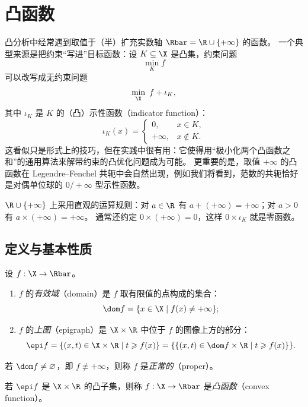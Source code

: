 \chapter{凸函数}
\label{ch:ch02}

凸分析中经常遇到取值于（半）扩充实数轴 $\Rbar = \R\cup\{+\infty\}$ 的函数。
一个典型来源是把约束“写进”目标函数：设 $K\subseteq\X$ 是凸集，约束问题
\[
  \min_{K} f
\]
可以改写成无约束问题
\[
  \min_{\X}\ f + \iota_K ,
\]
其中 $\iota_K$ 是 $K$ 的（凸）示性函数（indicator function）：
\[
  \iota_K(x) =
  \begin{cases}
    0, & x\in K,\\
    +\infty, & x\notin K.
  \end{cases}
\]
这看似只是形式上的技巧，但在实践中很有用：它使得用“极小化两个凸函数之和”的通用算法来解带约束的凸优化问题成为可能。
更重要的是，取值 $+\infty$ 的凸函数在 Legendre--Fenchel 共轭中会自然出现，例如我们将看到，范数的共轭恰好是对偶单位球的 $0/+\infty$ 型示性函数。

$\R\cup\{+\infty\}$ 上采用直观的运算规则：对 $a\in\R$ 有 $a+(+\infty)=+\infty$；对 $a>0$ 有 $a\times(+\infty)=+\infty$。
通常还约定 $0\times(+\infty)=0$，这样 $0\times\iota_K$ 就是零函数。

\section{定义与基本性质}

\begin{definition}[有效域与上图]
\label{def:11}
设 $f:\X\to\Rbar$。
\begin{enumerate}[label=(\roman*)]
  \item $f$ 的\emph{有效域}（domain）是 $f$ 取有限值的点构成的集合：
  \[
    \dom f = \{x\in\X \mid f(x)\neq+\infty\};
  \]
  \item $f$ 的\emph{上图}（epigraph）是 $\X\times\R$ 中位于 $f$ 的图像上方的部分：
  \[
    \epi f = \{(x,t)\in\X\times\R \mid t\geqslant f(x)\} = \{\{(x,t)\in\dom f\times\R \mid t\geqslant f(x)\}\}.
  \]
\end{enumerate}
若 $\dom f\neq\varnothing$，即 $f\not\equiv+\infty$，则称 $f$ 是\emph{正常的}（proper）。
\end{definition}

\begin{definition}[凸函数]
\label{def:12}
若 $\epi f$ 是 $\X\times\R$ 的凸子集，则称 $f:\X\to\Rbar$ 是\emph{凸函数}（convex function）。
\end{definition}

